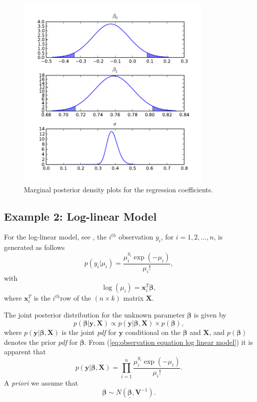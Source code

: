 \documentclass[article]{jss}
\begin{document}
\begin{figure}
  \begin{center}
    \includegraphics[width=9.5cm]{mpdreg.pdf}
  \end{center}
\caption{Marginal posterior density plots for the regression coefficients.}
\label{Flo:mpd reg}
\end{figure}



\subsection{Example 2: Log-linear Model}
\label{sub:Example-2:-Log-linear}

For the log-linear model, see \citet{GelmanCarlinSternRubin2004}, the
$i^{th}$ observation $y_{i}$, for $i=1,2,\dots,n$, is generated as
follows\begin{equation}
  p(y_{i}|\mu_{i})=\frac{\mu_{i}^{y_{i}}\exp(-\mu_{i})}{\mu_{i}!},\label{eq:observation
    equation log linear model}\end{equation} with \[
\log(\mu_{i})=\bm{x}_{i}^{T}\bm{\beta},\] where $\bm{x}_{i}^{T}$ is
the $i^{th}$row of the $\left(n\times k\right)$ matrix $\bm{X}.$

The joint posterior distribution for the unknown parameter
$\bm{\beta}$ is given by\begin{equation}
  p(\bm{\beta}|\bm{y},\bm{X})\propto p(\bm{y}|\bm{\beta},\bm{X})\times
  p(\bm{\beta}),\label{eq:post log_linear}\end{equation} where
$p(\bm{y}|\bm{\beta},\bm{X})$ is the joint \emph{pdf }for $\bm{y}$
conditional on the $\bm{\beta}$ and $\bm{X}$, and $p(\bm{\beta})$
denotes the prior \emph{pdf }for $\bm{\beta}.$ From
(\ref{eq:observation equation log linear model}) it is apparent that\[
p(\bm{y}|\bm{\beta},\bm{X})=\prod_{i=1}^{n}\frac{\mu_{i}^{y_{i}}\exp(-\mu_{i})}{\mu_{i}!}.\]
A \emph{priori }we assume that \[ \bm{\beta}\sim
N(\bm{\underline{\bm{\beta}}},\bm{V}^{-1}).\]
\end{document}
